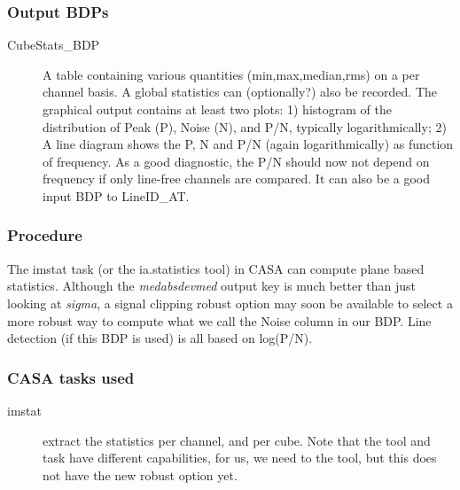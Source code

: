 \subsubsection{Output BDPs}

\begin{description}

\item[CubeStats\_BDP] A table containing various quantities (min,max,median,rms) on a per channel basis.
A global statistics can (optionally?) also be recorded. The graphical output contains at least two plots:
1) histogram of the distribution of Peak (P), Noise (N), and P/N, typically logarithmically; 
2) A line diagram shows the P, N and P/N (again logarithmically) as function of frequency.
As a good diagnostic, the P/N should now not depend on frequency if only line-free channels
are compared. It can also be a good input BDP to LineID\_AT.

\end{description}



\subsubsection{Procedure}

The imstat task (or the ia.statistics tool) in CASA can compute plane based statistics. Although
the  {\it medabsdevmed} output key is much better than just looking at {\it sigma}, 
a signal clipping robust option may soon be available to select a more robust way to compute what
we call the Noise column in our BDP. Line detection (if this BDP is used) is all based
on log(P/N).

\subsubsection{CASA tasks used}

\begin{description}

\item[imstat] extract the statistics per channel, and per cube. Note that
the tool and task have different capabilities, for us, we need to the tool,
but this does not have the new robust option yet.

\end{description}

\clearpage
